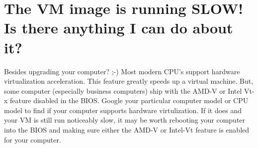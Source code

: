 \documentclass{article}
\begin{document}
\section{The VM image is running SLOW! Is there anything I can do about it?}

Besides upgrading your computer? ;-) Most modern CPU's support hardware virtualization acceleration. This feature greatly speeds up a virtual machine. But, some computer (especially business computers) ship with the AMD-V or Intel Vt-x feature disabled in the BIOS. Google your particular computer model or CPU model to find if your computer supports hardware virtulization. If it does and your VM is still run noticeably slow, it may be worth rebooting your computer into the BIOS and making sure either the AMD-V or Intel-Vt feature is enabled for your computer. 





	
	







\end{document}
